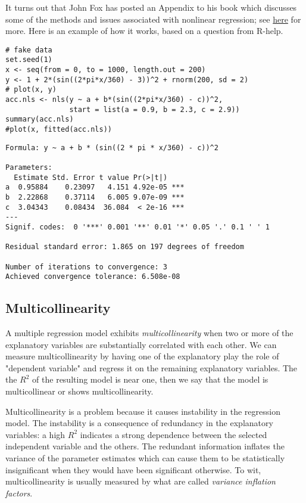 It turns out that John Fox has posted an Appendix to his book
\cite{Fox2002} which discusses some of the methods and issues
associated with nonlinear regression; see \href{http://cran.r-project.org/doc/contrib/Fox-Companion/appendix.html}{here} for more.  Here is an
example of how it works, based on a question from R-help.

\begin{verbatim}
# fake data 
set.seed(1) 
x <- seq(from = 0, to = 1000, length.out = 200) 
y <- 1 + 2*(sin((2*pi*x/360) - 3))^2 + rnorm(200, sd = 2)
# plot(x, y)
acc.nls <- nls(y ~ a + b*(sin((2*pi*x/360) - c))^2, 
               start = list(a = 0.9, b = 2.3, c = 2.9))
summary(acc.nls)
#plot(x, fitted(acc.nls))
\end{verbatim}

\begin{verbatim}
Formula: y ~ a + b * (sin((2 * pi * x/360) - c))^2

Parameters:
  Estimate Std. Error t value Pr(>|t|)    
a  0.95884    0.23097   4.151 4.92e-05 ***
b  2.22868    0.37114   6.005 9.07e-09 ***
c  3.04343    0.08434  36.084  < 2e-16 ***
---
Signif. codes:  0 '***' 0.001 '**' 0.01 '*' 0.05 '.' 0.1 ' ' 1

Residual standard error: 1.865 on 197 degrees of freedom

Number of iterations to convergence: 3 
Achieved convergence tolerance: 6.508e-08
\end{verbatim}

\subsection{Multicollinearity}
\label{sec-12-7-3}

A multiple regression model exhibits \emph{multicollinearity} when two or
more of the explanatory variables are substantially correlated with
each other. We can measure multicollinearity by having one of the
explanatory play the role of "dependent variable" and regress it on
the remaining explanatory variables. The the \(R^{2}\) of the
resulting model is near one, then we say that the model is
multicollinear or shows multicollinearity.

Multicollinearity is a problem because it causes instability in the
regression model. The instability is a consequence of redundancy in
the explanatory variables: a high \(R^{2}\) indicates a strong
dependence between the selected independent variable and the
others. The redundant information inflates the variance of the
parameter estimates which can cause them to be statistically
insignificant when they would have been significant otherwise. To wit,
multicollinearity is usually measured by what are called \emph{variance
inflation factors}.

